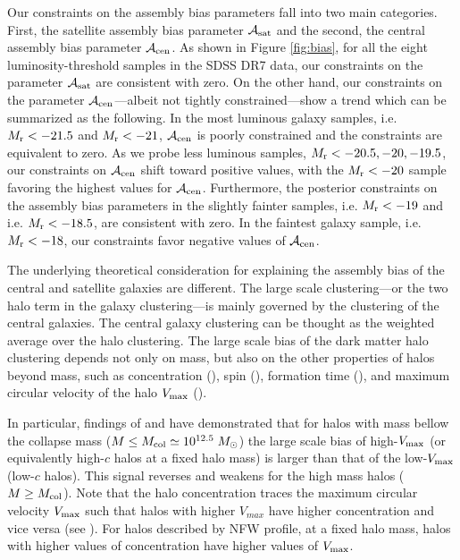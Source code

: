 \documentclass[12pt, preprint]{aastex}
\newcommand{\acen}{\mathcal{A}_{\rm cen}}
\newcommand{\asat}{\mathcal{A}_{\rm sat}}
\begin{document}
Our constraints on the assembly bias parameters fall into two main categories. First, the satellite 
assembly bias parameter $\asat$ and the second, the central assembly bias parameter $\acen$. As shown in Figure \ref{fig:bias}, for all the eight luminosity-threshold samples in the SDSS DR7 data, our constraints on the parameter $\asat$ are 
consistent with zero. On the other hand, our constraints on the parameter $\acen$---albeit not tightly constrained---show a trend which can be summarized as the following. In the most luminous galaxy samples, i.e. $M_{\rm r} < -21.5$ and $M_{\rm r} < -21$, $\acen$ is poorly constrained and the constraints are equivalent to zero. As we probe less luminous samples, $M_{\rm r} < -20.5 , -20, -19.5$, our constraints on $\acen$ shift toward positive values, with the $M_{\rm r}<-20$ sample favoring the highest values for $\acen$. Furthermore, the posterior constraints on the assembly bias parameters in the slightly fainter samples, i.e. $M_{\rm r} < -19$ and i.e. $M_{\rm r} < -18.5$, are consistent with zero. In the faintest galaxy sample, i.e. $M_{\rm r} < -18$, our constraints favor negative values of $\acen$.

The underlying theoretical consideration for explaining the assembly bias of the central 
and satellite galaxies are different. The large scale clustering---or the two halo term in the galaxy clustering---is mainly governed by the clustering of the central galaxies. The central galaxy clustering can be thought as the weighted average over the halo clustering. The large scale bias of the dark matter halo clustering depends not only on mass, but also on the other properties of halos beyond mass, such as concentration (\citealt{weschler2006,gao2007,miyatake2016}), spin (\citealt{gao2007}), formation time (\citealt{gao2007, li2008}), and maximum circular velocity of the halo $V_{\rm max}$ (\citealt{sunayama2016}).

In particular, findings of \citet{weschler2006} and \citet{sunayama2016}
have demonstrated that for halos with mass bellow the collapse mass ($M \leq M_{\rm col} \simeq 10^{12.5}\; M_{\odot} $) the large scale bias of high-$V_{\rm max}$ (or equivalently high-$c$ halos at a fixed halo mass) is larger than that of the low-$V_{\rm max}$ (low-$c$ halos). This signal reverses and weakens for the high mass halos ($M \geq M_{\rm col}$). Note that the halo concentration traces the maximum circular velocity $V_{\rm max}$ such that halos with higher $V_{max}$ have higher concentration and vice versa (see \citealt{prada2012}). For halos described by NFW profile, at a fixed halo mass, halos with higher values of concentration have higher values of $V_{\rm max}$.
\end{document}
